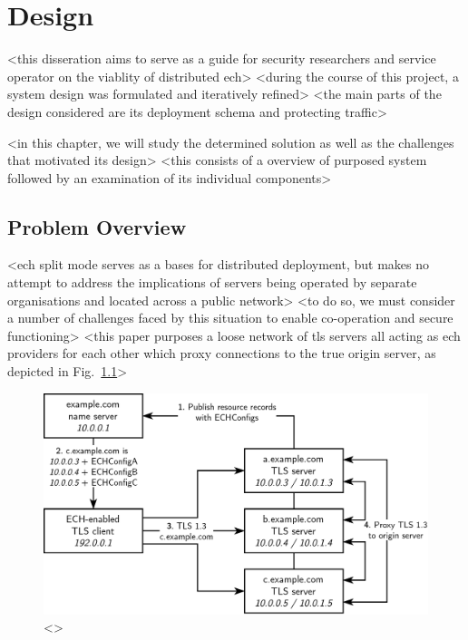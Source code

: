 \chapter{Design}\label{Design}

<this disseration aims to serve as a guide for security researchers and service operator on the viablity of distributed ech>
<during the course of this project, a system design was formulated and iteratively refined>
<the main parts of the design considered are its deployment schema and protecting traffic>

<in this chapter, we will study the determined solution as well as the challenges that motivated its design>
<this consists of a overview of purposed system followed by an examination of its individual components>



\section{Problem Overview}

<ech split mode serves as a bases for distributed deployment, but makes no attempt to address the implications of servers being operated by separate organisations and located across a public network>
<to do so, we must consider a number of challenges faced by this situation to enable co-operation and secure functioning>
<this paper purposes a loose network of tls servers all acting as ech providers for each other which proxy connections to the true origin server, as depicted in Fig.~\ref{distributed_ech_figure}>

\begin{figure}[ht]
\centerline{\includegraphics[width=160mm]{images/distributed-ech.png}}
\caption[Example distributed ECH deployment]{<>}
\label{distributed_ech_figure}
\end{figure}

